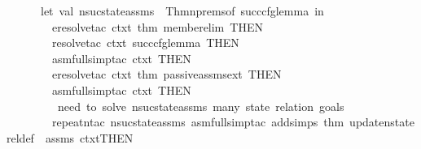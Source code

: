 \begin{isabellebody}
\ \ \ \ \ \ let\ val\ n{\isacharunderscore}{\kern0pt}suc{\isacharunderscore}{\kern0pt}state{\isacharunderscore}{\kern0pt}assms\ {\isacharequal}{\kern0pt}\ {\isacharparenleft}{\kern0pt}Thm{\isachardot}{\kern0pt}nprems{\isacharunderscore}{\kern0pt}of\ succ{\isacharunderscore}{\kern0pt}cfg{\isacharunderscore}{\kern0pt}lemma{\isacharparenright}{\kern0pt}{\isacharminus}{\kern0pt}{}\ in\isanewline
\ \ \ \ \ \ \ \ eresolve{\isacharunderscore}{\kern0pt}tac\ ctxt\ {\isacharbrackleft}{\kern0pt}{\isacharat}{\kern0pt}{\isacharbraceleft}{\kern0pt}thm\ member{\isacharunderscore}{\kern0pt}elim{\isacharbraceright}{\kern0pt}{\isacharbrackright}{\kern0pt}\ THEN{\isacharprime}{\kern0pt}\isanewline
\ \ \ \ \ \ \ \ resolve{\isacharunderscore}{\kern0pt}tac\ ctxt\ {\isacharbrackleft}{\kern0pt}succ{\isacharunderscore}{\kern0pt}cfg{\isacharunderscore}{\kern0pt}lemma{\isacharbrackright}{\kern0pt}\ THEN{\isacharprime}{\kern0pt}\isanewline
\ \ \ \ \ \ \ \ asm{\isacharunderscore}{\kern0pt}full{\isacharunderscore}{\kern0pt}simp{\isacharunderscore}{\kern0pt}tac\ ctxt\ THEN{\isacharprime}{\kern0pt}\isanewline
\ \ \ \ \ \ \ \ eresolve{\isacharunderscore}{\kern0pt}tac\ ctxt\ {\isacharbrackleft}{\kern0pt}{\isacharat}{\kern0pt}{\isacharbraceleft}{\kern0pt}thm\ passive{\isacharunderscore}{\kern0pt}assms{\isacharunderscore}{\kern0pt}{}{\isacharunderscore}{\kern0pt}ext{\isacharbraceright}{\kern0pt}{\isacharbrackright}{\kern0pt}\ THEN{\isacharprime}{\kern0pt}\isanewline
\ \ \ \ \ \ \ \ asm{\isacharunderscore}{\kern0pt}full{\isacharunderscore}{\kern0pt}simp{\isacharunderscore}{\kern0pt}tac\ ctxt\ THEN{\isacharprime}{\kern0pt}\ \ \ \ \ \ \ \ \isanewline
\ \ \ \ \ \ \ \ {\isacharparenleft}{\kern0pt}{\isacharasterisk}{\kern0pt}\ need\ to\ solve\ n{\isacharunderscore}{\kern0pt}suc{\isacharunderscore}{\kern0pt}state{\isacharunderscore}{\kern0pt}assms\ many\ state\ relation\ goals\ {\isacharasterisk}{\kern0pt}{\isacharparenright}{\kern0pt}\isanewline
\ \ \ \ \ \ \ \ repeat{\isacharunderscore}{\kern0pt}n{\isacharunderscore}{\kern0pt}tac{\isacharprime}{\kern0pt}\ n{\isacharunderscore}{\kern0pt}suc{\isacharunderscore}{\kern0pt}state{\isacharunderscore}{\kern0pt}assms\ {\isacharparenleft}{\kern0pt}asm{\isacharunderscore}{\kern0pt}full{\isacharunderscore}{\kern0pt}simp{\isacharunderscore}{\kern0pt}tac\ {\isacharparenleft}{\kern0pt}add{\isacharunderscore}{\kern0pt}simps\ {\isacharparenleft}{\kern0pt}{\isacharat}{\kern0pt}{\isacharbraceleft}{\kern0pt}thm\ update{\isacharunderscore}{\kern0pt}nstate{\isacharunderscore}{\kern0pt}rel{\isacharunderscore}{\kern0pt}def{\isacharbraceright}{\kern0pt}\ {\isacharcolon}{\kern0pt}{\isacharcolon}{\kern0pt}\ assms{\isacharparenright}{\kern0pt}\ ctxt{\isacharparenright}{\kern0pt}{\isacharparenright}{\kern0pt}THEN{\isacharprime}{\kern0pt}\isanewline

\end{isabellebody}

